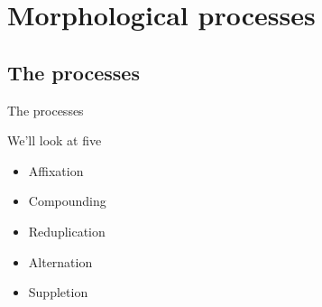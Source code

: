 \documentclass{beamer}
\subtitle[Morphological Processes]{Morphological Processes}
\newcommand{\suboneone}{The processes}
\begin{document}
  

  \section{Morphological processes}
    \subsection{\suboneone}
      \begin{frame}{\suboneone}
        \begin{block}{We'll look at five}
          \begin{itemize}
            \item Affixation
            \item Compounding
            \item Reduplication
            \item Alternation
            \item Suppletion
          \end{itemize}
        \end{block}
      \end{frame}
\end{document}
